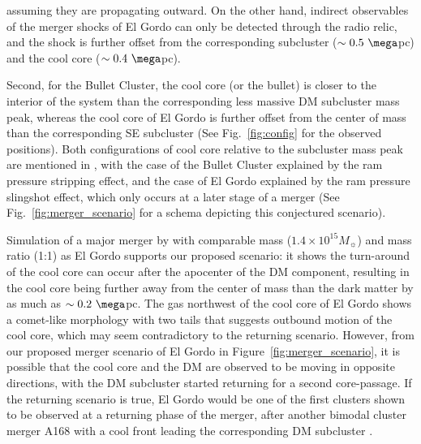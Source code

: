 \documentclass[letterpaper,useAMS,usenatbib]{mn2e}
\begin{document}
assuming they are propagating outward. On the other hand, indirect
observables of the merger shocks of El Gordo can only be detected through the radio relic, and the shock is
further offset from the corresponding subcluster ($\sim 0.5~\mega$pc) and
the cool core ($\sim 0.4~\mega$pc). \par
Second, for the Bullet Cluster, the cool core (or the bullet) is closer to the
interior of the system than the corresponding less massive DM subcluster mass
peak, whereas the cool core of El Gordo is further offset from the center of
mass than the corresponding SE subcluster (See Fig.~\ref{fig:config} for
the observed positions). 
Both configurations of cool core relative to the subcluster mass peak are
mentioned in \cite{Markevitch2007}, with the case of the Bullet Cluster
explained by the ram pressure stripping effect, and the case of El Gordo
explained by the ram pressure slingshot effect, which only occurs at a
later stage of a merger (See Fig.~\ref{fig:merger_scenario} for a schema depicting this conjectured scenario).\par 
Simulation of a major merger by
\cite{Mathis05} with comparable mass ($1.4 \times 10^{15} M_{\sun}$) and
mass ratio (1:1) as El Gordo supports
our proposed scenario: it shows the turn-around of the cool core can occur after the
apocenter of the DM component, resulting in the cool core being further
away from the center of mass than the dark matter by as much as $\sim
0.2~\mega$pc.  The gas northwest of the cool core of El Gordo shows a comet-like
morphology with two tails that suggests outbound motion of the cool core, which may seem
contradictory to the returning scenario. However, from our proposed merger
scenario of El Gordo in Figure~\ref{fig:merger_scenario},
it is possible that the cool core and the DM are observed to be moving in
opposite directions, with the DM subcluster started returning for a second core-passage. If the returning scenario is true, El Gordo would be one of the first
clusters shown to be observed at a returning phase of the merger, after another
bimodal cluster merger A168 with a cool front leading the corresponding DM
subcluster \citep{Hallman04}.
\end{document}
